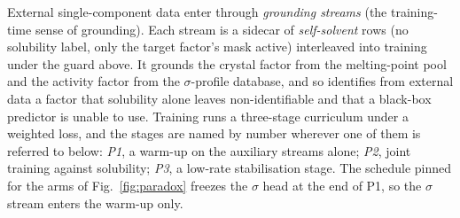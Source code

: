 External single-component data enter through \emph{grounding streams} (the training-time sense of
grounding). Each stream is a sidecar of \emph{self-solvent} rows (no solubility label, only the target
factor's mask active) interleaved into training under the guard above. It grounds the crystal factor
from the melting-point pool and the activity factor from the $\sigma$-profile database, and so
identifies from external data a factor that solubility alone leaves non-identifiable and that a
black-box predictor is unable to use. Training runs a three-stage curriculum under a weighted loss, and
the stages are named by number wherever one of them is referred to below: \emph{P1}, a warm-up on
the auxiliary streams alone; \emph{P2}, joint training against solubility; \emph{P3}, a low-rate
stabilisation stage. The
schedule pinned for the arms of Fig.~\ref{fig:paradox} freezes the $\sigma$ head at the end of P1,
so the $\sigma$ stream enters the warm-up only.

